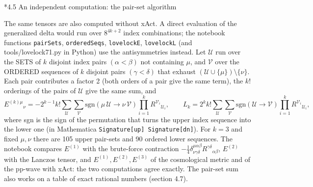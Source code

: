 \documentclass[10pt,a4paper]{article}
\makeatletter
\renewcommand\subsection{\@startsection{subsection}{2}{\z@}{-3.25ex\@plus -1ex \@minus -.2ex}{1.5ex \@plus .2ex}{\normalfont\large\bfseries\raggedright}}
\makeatother
\begin{document}
\subsection*{4.5 An independent computation: the pair-set algorithm}
The same tensors are also computed without xAct. A direct evaluation of the generalized delta would run over $8^{4k+2}$ index combinations; the notebook functions \texttt{pairSets}, \texttt{orderedSeqs}, \texttt{lovelockE}, \texttt{lovelockL} (and tools/lovelock71.py in Python) use the antisymmetries instead. Let $\mathcal U$ run over the SETS of $k$ disjoint index pairs $(\alpha<\beta)$ not containing $\mu$, and $\mathcal V$ over the ORDERED sequences of $k$ disjoint pairs $(\gamma<\delta)$ that exhaust $(\mathcal U\cup\lbrace\mu\rbrace)\setminus\lbrace\nu\rbrace$. Each pair contributes a factor 2 (both orders of a pair give the same term), the $k!$ orderings of the pairs of $\mathcal U$ give the same sum, and
\begin{equation*}
E^{(k)\mu}{}_{\nu}=-2^{k-1}k!\sum_{\mathcal U}\sum_{\mathcal V}\mathrm{sgn}(\mu\,\mathcal U\to\nu\,\mathcal V)\prod_{i=1}^{k}R^{\mathcal V_i}{}_{\mathcal U_i},\qquad L_k=2^kk!\sum_{\mathcal U}\sum_{\mathcal V}\mathrm{sgn}(\mathcal U\to\mathcal V)\prod_{i=1}^{k}R^{\mathcal V_i}{}_{\mathcal U_i},
\end{equation*}
where sgn is the sign of the permutation that turns the upper index sequence into the lower one (in Mathematica \texttt{Signature[up] Signature[dn]}). For $k=3$ and fixed $\mu,\nu$ there are 105 upper pair-sets and 90 ordered lower sequences. The notebook compares $E^{(1)}$ with the brute-force contraction $-\tfrac14\delta^{\mu\alpha\beta}_{\nu\gamma\delta}R^{\gamma\delta}{}_{\alpha\beta}$, $E^{(2)}$ with the Lanczos tensor, and $E^{(1)},E^{(2)},E^{(3)}$ of the cosmological metric and of the pp-wave with xAct: the two computations agree exactly. The pair-set sum also works on a table of exact rational numbers (section 4.7).
\end{document}
